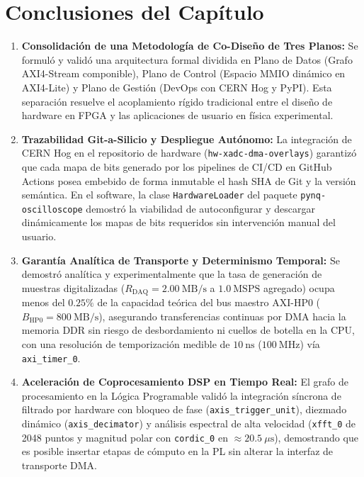 \documentclass[standalone]{subfiles}
\begin{document}
\section{Conclusiones del Capítulo}
\label{sec:conclusiones_ch1}

\begin{enumerate}
    \item \textbf{Consolidación de una Metodología de Co-Diseño de Tres Planos:} Se formuló y validó una arquitectura formal dividida en Plano de Datos (Grafo AXI4-Stream componible), Plano de Control (Espacio MMIO dinámico en AXI4-Lite) y Plano de Gestión (DevOps con CERN Hog y PyPI). Esta separación resuelve el acoplamiento rígido tradicional entre el diseño de hardware en FPGA y las aplicaciones de usuario en física experimental.
    
    \item \textbf{Trazabilidad Git-a-Silicio y Despliegue Autónomo:} La integración de CERN Hog en el repositorio de hardware (\texttt{hw-xadc-dma-overlays}) garantizó que cada mapa de bits generado por los pipelines de CI/CD en GitHub Actions posea embebido de forma inmutable el hash SHA de Git y la versión semántica. En el software, la clase \texttt{HardwareLoader} del paquete \texttt{pynq-oscilloscope} demostró la viabilidad de autoconfigurar y descargar dinámicamente los mapas de bits requeridos sin intervención manual del usuario.
    
    \item \textbf{Garantía Analítica de Transporte y Determinismo Temporal:} Se demostró analítica y experimentalmente que la tasa de generación de muestras digitalizadas ($R_{\text{DAQ}} = 2.00~\text{MB/s}$ a $1.0~\text{MSPS}$ agregado) ocupa menos del $0.25\%$ de la capacidad teórica del bus maestro AXI-HP0 ($B_{\text{HP0}} = 800~\text{MB/s}$), asegurando transferencias continuas por DMA hacia la memoria DDR sin riesgo de desbordamiento ni cuellos de botella en la CPU, con una resolución de temporización medible de $10~\text{ns}$ ($100~\text{MHz}$) vía \texttt{axi\_timer\_0}.
    
    \item \textbf{Aceleración de Coprocesamiento DSP en Tiempo Real:} El grafo de procesamiento en la Lógica Programable validó la integración síncrona de filtrado por hardware con bloqueo de fase (\texttt{axis\_trigger\_unit}), diezmado dinámico (\texttt{axis\_decimator}) y análisis espectral de alta velocidad (\texttt{xfft\_0} de 2048 puntos y magnitud polar con \texttt{cordic\_0} en $\approx 20.5~\mu\text{s}$), demostrando que es posible insertar etapas de cómputo en la PL sin alterar la interfaz de transporte DMA.
    

\end{enumerate}
\end{document}
